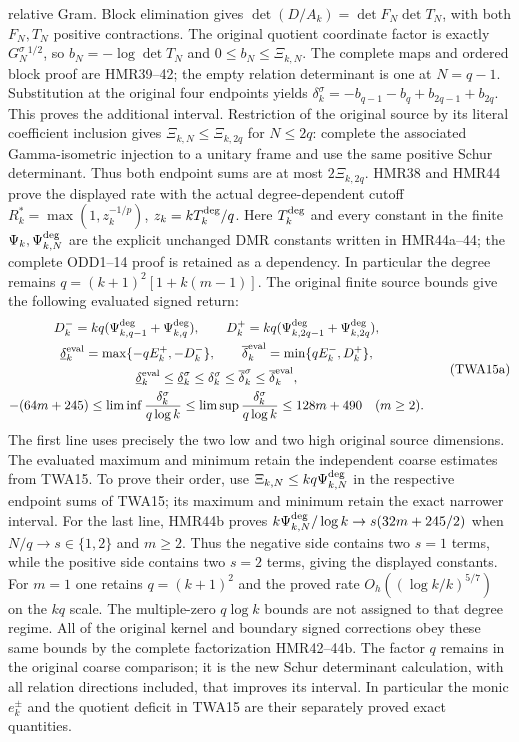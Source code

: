 relative Gram. Block elimination gives
$\det(D/A_k)=\det F_N\det T_N$, with both $F_N,T_N$
positive contractions. The original quotient coordinate
factor is exactly $G_N^\sigma{}^{1/2}$, so
$b_N=-\log\det T_N$ and
$0\leq b_N\leq\Xi_{k,N}$. The complete maps and ordered
block proof are HMR39--42; the empty relation determinant
is one at $N=q-1$.
Substitution at the original four endpoints yields
$\delta_k^\sigma=-b_{q-1}-b_q+b_{2q-1}+b_{2q}$.
This proves the additional interval.
Restriction of the original source by its literal coefficient
inclusion gives $\Xi_{k,N}\leq\Xi_{k,2q}$ for $N\leq2q$:
complete the associated Gamma-isometric injection to a
unitary frame and use the same positive Schur determinant.
Thus both endpoint sums are at most $2\Xi_{k,2q}$.
HMR38 and HMR44 prove the displayed rate with the actual
degree-dependent cutoff $R_k^*=\max(1,z_k^{-1/p})$,
$z_k=kT_k^{\rm deg}/q$. Here $T_k^{\rm deg}$ and every constant
in the finite $\Psi_k,\Psi_{k,N}^{\rm deg}$ are the explicit
unchanged DMR constants written in HMR44a--44; the complete
ODD1--14 proof is retained as a dependency. In particular the
degree remains $q=(k+1)^2[1+k(m-1)]$. The original finite
source bounds give the following evaluated signed return:
\[
\begin{gathered}
 D_k^-=kq(\Psi_{k,q-1}^{\rm deg}+\Psi_{k,q}^{\rm deg}),\qquad
 D_k^+=kq(\Psi_{k,2q-1}^{\rm deg}+\Psi_{k,2q}^{\rm deg}),\\
 \underline\delta_k^{\rm eval}=\max\{-qE_k^+,-D_k^-\},\qquad
 \overline\delta_k^{\rm eval}=\min\{qE_k^-,D_k^+\},\\
 \underline\delta_k^{\rm eval}\leq\underline\delta_k^\sigma
 \leq\delta_k^\sigma\leq\overline\delta_k^\sigma
                    \leq\overline\delta_k^{\rm eval},\\
 -(64m+245)\leq\liminf\frac{\delta_k^\sigma}{q\log k}
 \leq\limsup\frac{\delta_k^\sigma}{q\log k}
 \leq128m+490\quad(m\geq2).
\end{gathered}\tag{TWA15a}
\]
The first line uses precisely the two low and two high original
source dimensions. The evaluated maximum and minimum retain the
independent coarse estimates from TWA15. To prove their order, use
$\Xi_{k,N}\leq kq\Psi_{k,N}^{\rm deg}$ in the respective
endpoint sums of TWA15; its maximum and minimum retain the
exact narrower interval. For the last line, HMR44b proves
$k\Psi_{k,N}^{\rm deg}/\log k\to s(32m+245/2)$ when
$N/q\to s\in\{1,2\}$ and $m\geq2$. Thus the negative
side contains two $s=1$ terms, while the positive side
contains two $s=2$ terms, giving the displayed constants.
For $m=1$ one retains $q=(k+1)^2$ and the proved rate
$O_h((\log k/k)^{5/7})$ on the $kq$ scale. The multiple-zero
$q\log k$ bounds are not assigned to that degree regime.
All of the original kernel and boundary signed corrections
obey these same bounds by the complete factorization HMR42--44b.
The factor $q$ remains in the original coarse comparison;
it is the new Schur determinant calculation, with all
relation directions included, that improves its interval.
In particular the monic $e_k^\pm$ and the quotient deficit
in TWA15 are their separately proved exact quantities.


